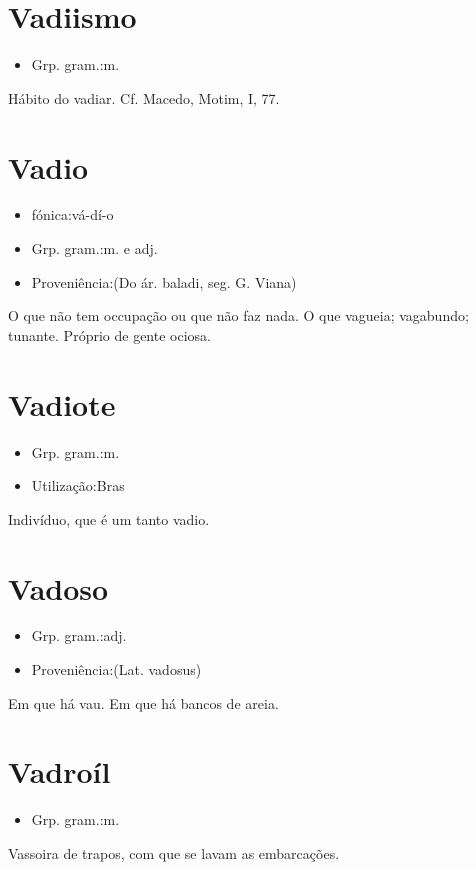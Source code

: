 \documentclass{article}
\begin{document}
\section{Vadiismo}
\begin{itemize}
\item {Grp. gram.:m.}
\end{itemize}
Hábito do vadiar. Cf. Macedo, \textunderscore Motim\textunderscore , I, 77.
\section{Vadio}
\begin{itemize}
\item {fónica:vá-dí-o}
\end{itemize}
\begin{itemize}
\item {Grp. gram.:m.  e  adj.}
\end{itemize}
\begin{itemize}
\item {Proveniência:(Do ár. \textunderscore baladi\textunderscore , seg. G. Viana)}
\end{itemize}
O que não tem occupação ou que não faz nada.
O que vagueia; vagabundo; tunante.
Próprio de gente ociosa.
\section{Vadiote}
\begin{itemize}
\item {Grp. gram.:m.}
\end{itemize}
\begin{itemize}
\item {Utilização:Bras}
\end{itemize}
Indivíduo, que é um tanto vadio.
\section{Vadoso}
\begin{itemize}
\item {Grp. gram.:adj.}
\end{itemize}
\begin{itemize}
\item {Proveniência:(Lat. \textunderscore vadosus\textunderscore )}
\end{itemize}
Em que há vau.
Em que há bancos de areia.
\section{Vadroíl}
\begin{itemize}
\item {Grp. gram.:m.}
\end{itemize}
Vassoira de trapos, com que se lavam as embarcações.
\end{document}
